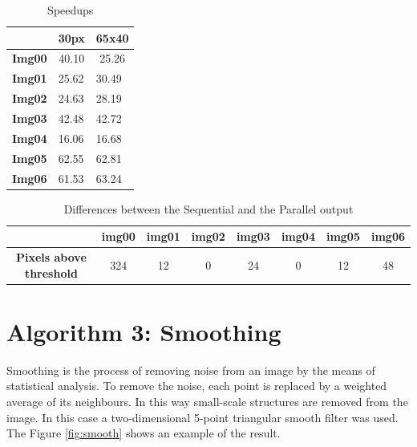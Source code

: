 \documentclass[a4paper]{article}
\begin{document}
\begin{table}[!ht]
\centering
\label{tab:histo_sp}
\begin{tabular}{|l|l|l|}
\hline
\multicolumn{1}{|c|}{}               & \textbf{30px}              & \multicolumn{1}{c|}{\textbf{65x40}} \\ \hline
\multicolumn{1}{|c|}{\textbf{Img00}} & \multicolumn{1}{c|}{40.10} & \multicolumn{1}{c|}{25.26}          \\ \hline
\textbf{Img01}                       & 25.62                      & 30.49                               \\ \hline
\textbf{Img02}                       & 24.63                      & 28.19                               \\ \hline
\textbf{Img03}                       & 42.48                      & 42.72                               \\ \hline
\textbf{Img04}                       & 16.06                      & 16.68                               \\ \hline
\textbf{Img05}                       & 62.55                      & 62.81                               \\ \hline
\textbf{Img06}                       & 61.53                      & 63.24                               \\ \hline
\end{tabular}
\caption{Speedups}
\end{table}
\FloatBarrier



\begin{table}[!ht]
\centering
\caption{Differences between the Sequential and the Parallel output}
\label{pxabh}
\begin{tabular}{|c|l|c|c|l|l|l|l|}
\hline
\textbf{}                        & \textbf{img00}           & \textbf{img01} & \textbf{img02} & \textbf{img03}          & \textbf{img04}         & \textbf{img05}          & \textbf{img06}          \\ \hline
\textbf{Pixels above  threshold} & \multicolumn{1}{c|}{324} & 12             & 0              & \multicolumn{1}{c|}{24} & \multicolumn{1}{c|}{0} & \multicolumn{1}{c|}{12} & \multicolumn{1}{c|}{48} \\ \hline
\end{tabular}
\end{table}
 

\section{Algorithm 3: Smoothing}
\label{sec:smoo}
Smoothing is the process of removing noise from an image by the means of statistical analysis. To remove the noise, each point is replaced by a weighted average of its neighbours. In this way small-scale structures are removed from the image. In this case a two-dimensional 5-point triangular smooth filter was used. The Figure \ref{fig:smooth} shows an example of the result.
\end{document}

